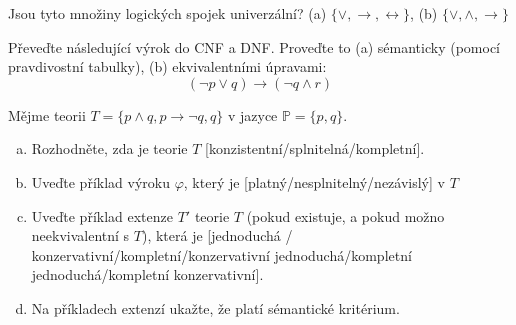 \documentclass[a4paper,11pt]{amsart}
\begin{document}
\begin{problem} 
    
    Jsou tyto množiny logických spojek univerzální? (a) $\{\vee, \rightarrow, \leftrightarrow\}$, (b) $\{\vee, \wedge, \rightarrow\}$    

    \begin{solution}
            
    \end{solution}


\end{problem}


\begin{problem} 
    
    Převeďte následující výrok do CNF a DNF. Proveďte to (a) sémanticky (pomocí pravdivostní tabulky), (b) ekvivalentními úpravami:
    $$
    (\neg p \vee q)\to (\neg q \wedge r)
    $$

    \begin{solution}
            
    \end{solution}
        
\end{problem}


\begin{problem}\label{problem:properties-of-theories}

    Mějme teorii $T=\{p\wedge q,p\to\neg q,q\}$ v jazyce $\mathbb P=\{p,q\}$.
    \begin{enumerate}[(a)]
        \item Rozhodněte, zda je teorie $T$ [konzistentní/splnitelná/kompletní]. %
        \item Uveďte příklad výroku $\varphi$, který je [platný/nesplnitelný/nezávislý] v $T$
        \item Uveďte příklad extenze $T'$ teorie $T$ (pokud existuje, a pokud možno neekvivalentní s $T$), která je [jednoduchá / konzervativní/kompletní/konzervativní jednoduchá/kompletní jednoduchá/kompletní konzervativní].
        \item Na příkladech extenzí ukažte, že platí sémantické kritérium.
    \end{enumerate}

    \begin{solution}
            
    \end{solution}
    
\end{problem}
\end{document}
